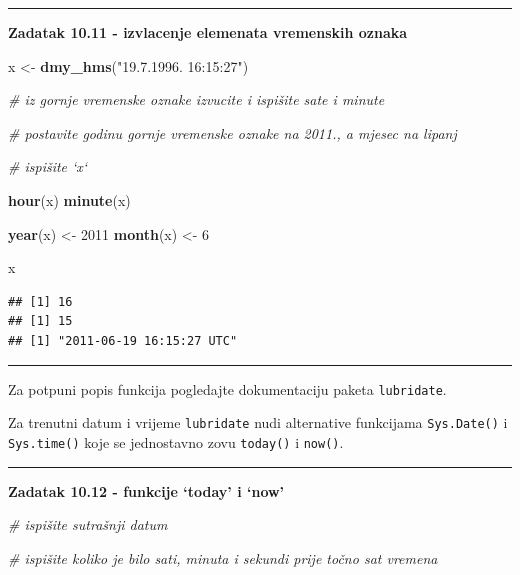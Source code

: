 \documentclass[]{book}
\newenvironment{Shaded}{\begin{snugshade}}{\end{snugshade}}
\newcommand{\KeywordTok}[1]{\textcolor[rgb]{0.13,0.29,0.53}{\textbf{#1}}}
\newcommand{\DecValTok}[1]{\textcolor[rgb]{0.00,0.00,0.81}{#1}}
\newcommand{\StringTok}[1]{\textcolor[rgb]{0.31,0.60,0.02}{#1}}
\newcommand{\CommentTok}[1]{\textcolor[rgb]{0.56,0.35,0.01}{\textit{#1}}}
\newcommand{\NormalTok}[1]{#1}
\theoremstyle{definition}
\theoremstyle{definition}
\theoremstyle{definition}
\theoremstyle{remark}
\begin{document}
\begin{center}\rule{0.5\linewidth}{\linethickness}\end{center}

\textbf{Zadatak 10.11 - izvlacenje elemenata vremenskih oznaka}

\begin{Shaded}
\begin{Highlighting}[]
\NormalTok{x <-}\StringTok{ }\KeywordTok{dmy_hms}\NormalTok{(}\StringTok{"19.7.1996. 16:15:27"}\NormalTok{)}

\CommentTok{# iz gornje vremenske oznake izvucite i ispišite sate i minute}

\CommentTok{# postavite godinu gornje vremenske oznake na 2011., a mjesec na lipanj}

\CommentTok{# ispišite `x`}
\end{Highlighting}
\end{Shaded}

\begin{Shaded}
\begin{Highlighting}[]
\KeywordTok{hour}\NormalTok{(x)}
\KeywordTok{minute}\NormalTok{(x)}

\KeywordTok{year}\NormalTok{(x) <-}\StringTok{ }\DecValTok{2011}
\KeywordTok{month}\NormalTok{(x) <-}\StringTok{ }\DecValTok{6}

\NormalTok{x}
\end{Highlighting}
\end{Shaded}

\begin{verbatim}
## [1] 16
## [1] 15
## [1] "2011-06-19 16:15:27 UTC"
\end{verbatim}

\begin{center}\rule{0.5\linewidth}{\linethickness}\end{center}

Za potpuni popis funkcija pogledajte dokumentaciju paketa
\texttt{lubridate}.

Za trenutni datum i vrijeme \texttt{lubridate} nudi alternative
funkcijama \texttt{Sys.Date()} i \texttt{Sys.time()} koje se jednostavno
zovu \texttt{today()} i \texttt{now()}.

\begin{center}\rule{0.5\linewidth}{\linethickness}\end{center}

\textbf{Zadatak 10.12 - funkcije `today' i `now'}

\begin{Shaded}
\begin{Highlighting}[]
\CommentTok{# ispišite sutrašnji datum}

\CommentTok{# ispišite koliko je bilo sati, minuta i sekundi prije točno sat vremena}
\end{Highlighting}
\end{Shaded}
\end{document}
